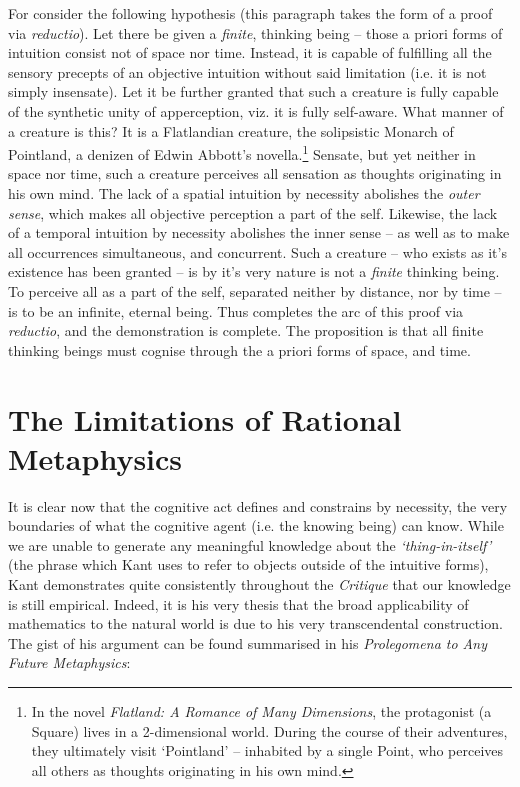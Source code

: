 \noindent
For consider the following hypothesis (this paragraph takes the form of a proof via \emph{reductio}). Let there be given a \emph{finite}, thinking being -- those a priori forms of intuition consist not of space nor time. Instead, it is capable of fulfilling all the sensory precepts of an objective intuition without said limitation (i.e. it is not simply insensate). Let it be further granted that such a creature is fully capable of the synthetic unity of apperception, viz. it is fully self-aware. What manner of a creature is this? It is a Flatlandian creature, the solipsistic Monarch of Pointland, a denizen of Edwin Abbott's novella.\footnote{In the novel \emph{Flatland: A Romance of Many Dimensions}, the protagonist (a Square) lives in a 2-dimensional world. During the course of their adventures, they ultimately visit `Pointland' -- inhabited by a single Point, who perceives all others as thoughts originating in his own mind.} Sensate, but yet neither in space nor time, such a creature perceives all sensation as thoughts originating in his own mind. The lack of a spatial intuition by necessity abolishes the \emph{outer sense}, which makes all objective perception a part of the self. Likewise, the lack of a temporal intuition by necessity abolishes the inner sense -- as well as to make all occurrences simultaneous, and concurrent. Such a creature -- who exists as it's existence has been granted -- is by it's very nature is not a \emph{finite} thinking being. To perceive all as a part of the self, separated neither by distance, nor by time -- is to be an infinite, eternal being. Thus completes the arc of this proof via \emph{reductio}, and the demonstration is complete. The proposition is that all finite thinking beings must cognise through the a priori forms of space, and time.

\section*{The Limitations of Rational Metaphysics}
It is clear now that the cognitive act defines and constrains by necessity, the very boundaries of what the cognitive agent (i.e. the knowing being) can know. While we are unable to generate any meaningful knowledge about the \emph{`thing-in-itself'} (the phrase which Kant uses to refer to objects outside of the intuitive forms), Kant demonstrates quite consistently throughout the \emph{Critique} that our knowledge is still empirical. Indeed, it is his very thesis that the broad applicability of mathematics to the natural world is due to his very transcendental construction. The gist of his argument can be found summarised in his \emph{Prolegomena to Any Future Metaphysics}:

